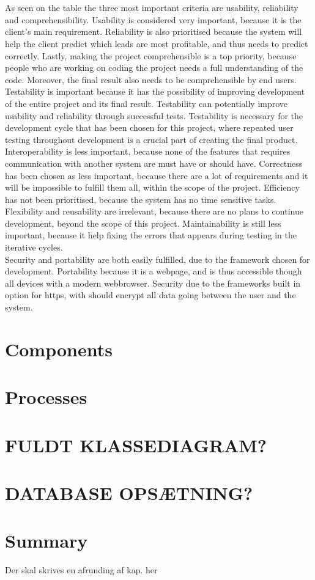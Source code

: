 \\\\
As seen on the table the three most important criteria are usability, reliability and comprehensibility. Usability is considered very important, because it is the client's main requirement. Reliability is also prioritised because the system will help the client predict which leads are most profitable, and thus needs to predict correctly.
Lastly, making the project comprehensible is a top priority, because people who are working on coding the project needs a full understanding of the code. Moreover, the final result also needs to be comprehensible by end users.
\\
Testability is important because it has the possibility of improving development of the entire project and its final result. Testability can potentially improve usability and reliability through successful tests. Testability is necessary for the development cycle that has been chosen for this project, where repeated user testing throughout development is a crucial part of creating the final product.
\\
Interoperability is less important, because none of the features that requires communication with another system are must have or should have.
Correctness has been chosen as less important, because there are a lot of requirements and it will be impossible to fulfill them all, within the scope of the project. Efficiency has not been prioritised, because the system has no time sensitive tasks.
\\
Flexibility and reusability are irrelevant, because there are no plans to continue development, beyond the scope of this project. Maintainability is still less important, because it help fixing the errors that appears during testing in the iterative cycles.
\\

Security and portability are both easily fulfilled, due to the framework chosen for development. Portability because it is a webpage, and is thus accessible though all devices with a modern webbrowser. Security due to the frameworks built in option for https, with should encrypt all data going between the user and the system.


\section{Components}

\section{Processes}

\section{FULDT KLASSEDIAGRAM?}

\section{DATABASE OPSÆTNING?}

\section{Summary}
Der skal skrives en afrunding af kap. her
